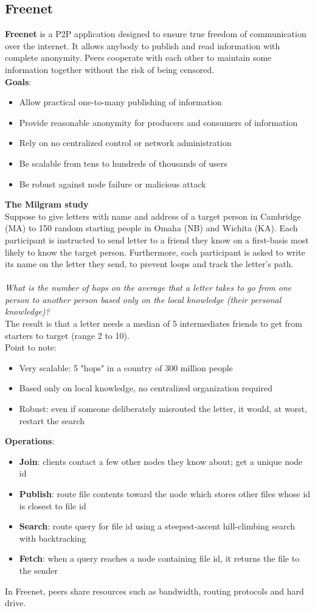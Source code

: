 \documentclass[10pt,a4paper]{article}
\begin{document}
\subsection{Freenet}
\textbf{Freenet} is a P2P application designed to ensure true freedom of communication over the internet. It allows anybody to publish and read information with complete anonymity. Peers cooperate with each other to maintain some information together without the risk of being censored. \\
\textbf{Goals}:
\begin{itemize}
	\item Allow practical one-to-many publishing of information
	\item Provide reasonable anonymity for producers and consumers of information
	\item Rely on no centralized control or network administration
	\item Be scalable from tens to hundreds of thousands of users
	\item Be robust against node failure or malicious attack
\end{itemize}
\textbf{The Milgram study} \\
Suppose to give letters with name and address of a target person in Cambridge (MA) to 150 random starting people in Omaha (NB) and Wichita (KA). Each participant is instructed to send letter to a friend they know on a first-basis most likely to know the target person. Furthermore, each participant is asked to write its name on the letter they send, to prevent loops and track the letter's path. \\ \\
\textit{What is the number of hops on the average that a letter takes to go from one person to another person based only on the local knowledge (their personal knowledge)?} \\ The result is that a letter needs a median of 5 intermediates friends to get from starters to target (range 2 to 10). \\ 
Point to note:
\begin{itemize}
	\item Very scalable: 5 "hops" in a country of 300 million people
	\item Based only on local knowledge, no centralized organization required
	\item Robust: even if someone deliberately misrouted the letter, it would, at worst, restart the search
\end{itemize}
\textbf{Operations}:
\begin{itemize}
	\item \textbf{Join}: clients contact a few other nodes they know about; get a unique node id
	\item \textbf{Publish}: route file contents toward the node which stores other files whose id is closest to file id
	\item \textbf{Search}: route query for file id using a steepest-ascent hill-climbing search with backtracking
	\item \textbf{Fetch}: when a query reaches a node containing file id, it returns the file to the sender
\end{itemize}
In Freenet, peers share resources such as bandwidth, routing protocols and hard drive.
\end{document}

